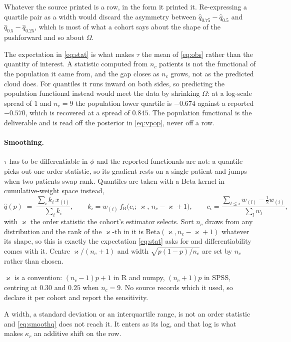 \documentclass[11pt]{article}
\begin{document}
Whatever the source printed is a row, in the form it printed it. Re-expressing a
quartile pair as a width would discard the asymmetry between $\hat q_{0.75}-\hat
q_{0.5}$ and $\hat q_{0.5}-\hat q_{0.25}$, which is most of what a cohort says
about the shape of the pushforward and so about $\Omega$.

The expectation in \eqref{eq:stat} is what makes $\tau$ the mean of
\eqref{eq:obs} rather than the quantity of interest. A statistic computed from
$n_c$ patients is not the functional of the population it came from, and the gap
closes as $n_c$ grows, not as the predicted cloud does. For quantiles it runs
inward on both sides, so predicting the population functional instead would meet
the data by shrinking $\Omega$: at a log-scale spread of $1$ and $n_c=9$ the
population lower quartile is $-0.674$ against a reported $-0.570$, which is
recovered at a spread of $0.845$. The population functional is the deliverable
and is read off the posterior in \eqref{eq:vpop}, never off a row.

\paragraph{Smoothing.} $\tau$ has to be differentiable in $\phi$ and the reported
functionals are not: a quantile picks out one order statistic, so its gradient
rests on a single patient and jumps when two patients swap rank. Quantiles are
taken with a Beta kernel in cumulative-weight space instead,
\begin{equation}
\hat q(p) \;=\; \frac{\sum_i k_i\,x_{(i)}}{\sum_i k_i},
\qquad
k_i = w_{(i)}\,f_{\text{B}}\big(c_i;\,\varkappa,\,n_c-\varkappa+1\big),
\qquad
c_i = \frac{\sum_{l\le i} w_{(l)} - \tfrac12 w_{(i)}}{\sum_l w_l},
\label{eq:smoothq}
\end{equation}
with $\varkappa$ the order statistic the cohort's estimator selects. Sort $n_c$
draws from any distribution and the rank of the $\varkappa$-th in it is
$\text{Beta}(\varkappa,n_c-\varkappa+1)$ whatever its shape, so this is exactly
the expectation \eqref{eq:stat} asks for and differentiability comes with it.
Centre $\varkappa/(n_c+1)$ and width $\sqrt{p(1-p)/n_c}$ are set by $n_c$ rather
than chosen.

$\varkappa$ is a convention: $(n_c-1)p+1$ in R and numpy, $(n_c+1)p$ in SPSS,
centring at $0.30$ and $0.25$ when $n_c=9$. No source records which it used, so
declare it per cohort and report the sensitivity.

A width, a standard deviation or an interquartile range, is not an order
statistic and \eqref{eq:smoothq} does not reach it. It enters as its log, and
that log is what makes $\kappa_r$ an additive shift on the row.
\end{document}
